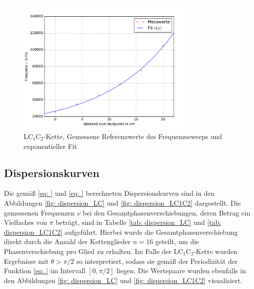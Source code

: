 \FloatBarrier
\begin{figure}
  \centering
  \includegraphics[width = 0.8\textwidth]{../Messdaten/plots/frequenzsweep_LC1C2.pdf}
  \caption{$\mathup{LC_1C_2}$-Kette, Gemessene Referenzwerte des Frequenzssweeps und exponentieller Fit}
  \label{fig: plot_sweep_LC1C2}
\end{figure}
\newpage
\subsection{Dispersionskurven}
Die gemäß \eqref{eq: } und \eqref{eq: } berechneten Dispersionskurven sind in den Abbildungen \ref{fig: dispersion_LC} und \ref{fig: dispersion_LC1C2}
dargestellt. Die gemessenen Frequenzen $\nu$ bei den Gesamtphasenverschiebungen, deren Betrag ein Vielfaches von $\pi$ beträgt,
sind in Tabelle \ref{tab: dispersion_LC} und \ref{tab: dispersion_LC1C2} aufgeführt. Hierbei wurde die Gesamtphasenverschiebung direkt durch die
Anzahl der Kettenglieder $n = 16$ geteilt, um die Phasenverschiebung pro Glied zu erhalten. Im Falle der $\mathup{LC_1C_2}$-Kette
wurden Ergebnisse mit $\theta > \pi/2$ so interpretiert, sodass sie gemäß der Periodizität der Funktion \eqref{eq: } im Intervall
$[0, \pi/2]$ liegen. Die Wertepaare wurden ebenfalls in den Abbildungen \ref{fig: dispersion_LC} und \ref{fig: dispersion_LC1C2} visualisiert.



